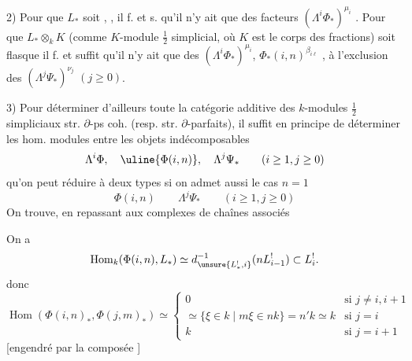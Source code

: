 2) Pour que $L_*$ soit , ,
il f. et s.
qu'il n'y ait que des facteurs
$(\Lambda^i\Phi_*)^{\mu_i}$
.
Pour que $L_*\otimes_k K$ (comme
$K$-module $\frac12$ simplicial, où $K$ est le
corps des fractions) soit flasque
il f. et suffit qu'il n'y ait que des
$(\Lambda^i\Phi_*)^{\mu_i}$, $\Phi_*(i,n)^{\beta_{i\ell}}$
, à l'exclusion
des $(\Lambda^j\Psi_*)^{\nu_j}$ $(j\geq0)$.

3) Pour déterminer d'ailleurs toute la
catégorie additive des $k$-modules
$\frac12$ simpliciaux str. $\partial$-ps coh. (resp.
str. $\partial$-parfaits), il suffit en principe
de déterminer les hom. modules
entre les objets indécomposables
\[
\Lambda^i\Phi,\quad\uline{\Phi(i,n)},\quad\Lambda^j\Psi_*
\qquad(i\geq1,j\geq0)
\]
qu'on peut réduire à deux types si
on admet aussi le cas $n=1$
\[
\Phi(i,n)\qquad\Lambda^j\Psi_*
\qquad(i\geq1,j\geq0)
\]
On trouve, en repassant aux
complexes de chaînes associés

On a
\[
\operatorname{Hom}_k(\Phi(i,n),L_*)
\simeq d^{-1}_{\unsure{L^!_*,i}}(nL^!_{i-1})\subset L^!_i.
\]
donc
\[
\operatorname{Hom}(\Phi(i,n)_*,\Phi(j,m)_*)\simeq
\left\{\begin{array}{ll}
0&\text{si }j\neq i,i+1\\
\simeq\{\xi\in k\mid m\xi\in nk\}=n'k\simeq k&
\text{si }j=i\\
k&\text{si }j=i+1
\end{array}\right.
\]
[engendré par la composée
]

